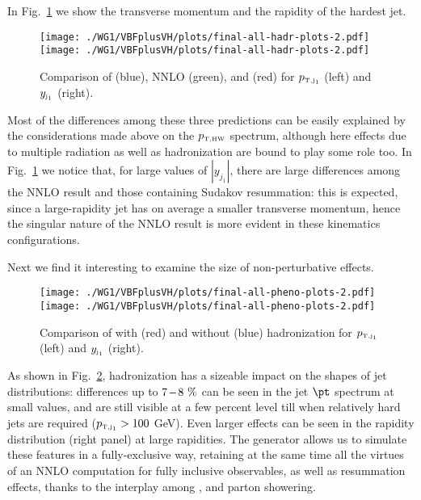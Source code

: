 In Fig.~\ref{fig:extra_ptj1_yj1} we show the transverse momentum and the
rapidity of the hardest jet.
\begin{figure}
  \centering
  \texttt{[image: ./WG1/VBFplusVH/plots/final-all-hadr-plots-2.pdf]}
  \texttt{[image: ./WG1/VBFplusVH/plots/final-all-hadr-plots-2.pdf]}
  \caption{Comparison of \HWJMINLOPS{} (blue), NNLO (green), and \HWNNLOPS{} (red) for $p_{\scriptscriptstyle \mathrm{T,j_{1}}}$ (left) and $y_{\scriptscriptstyle \mathrm{j_{1}}}$ (right).}
  \label{fig:extra_ptj1_yj1}
\end{figure}
Most of the differences among these three predictions can be easily
explained by the considerations made above on the $p_{\scriptscriptstyle \mathrm{T,HW}}$ spectrum,
although here effects due to multiple radiation as well as
hadronization are bound to play some role too.  In
Fig.~\ref{fig:extra_ptj1_yj1} we notice that, for large values of
$|y_{j_1}|$, there are large differences among the NNLO result and
those containing Sudakov resummation: this is expected, since a
large-rapidity jet has on average a smaller transverse momentum, hence
the singular nature of the NNLO result is more evident in these
kinematics configurations.

    
Next we find it interesting to examine the size of
non-perturbative effects.
\begin{figure}
  \centering
  \texttt{[image: ./WG1/VBFplusVH/plots/final-all-pheno-plots-2.pdf]}
  \texttt{[image: ./WG1/VBFplusVH/plots/final-all-pheno-plots-2.pdf]}
  \caption{Comparison of \HWNNLOPSshort{} with (red) and without (blue) hadronization for $p_{\scriptscriptstyle \mathrm{T,j_{1}}}$ (left) and $y_{\scriptscriptstyle \mathrm{j_{1}}}$ (right).}
  \label{fig:extra_nohad_ptj1_yj1}
\end{figure}
As shown in Fig.~\ref{fig:extra_nohad_ptj1_yj1}, hadronization has a
sizeable impact on the shapes of jet distributions: differences up to
$7\hspace{-0.05cm}-\hspace{-0.05cm}8~\%$ can be seen in the jet $\pt$
spectrum at small values, and are still visible at a few percent
level till when relatively hard jets are required ($p_{\scriptscriptstyle \mathrm{T,j_{1}}} > 100$
GeV). Even larger effects can be seen in the rapidity distribution (right panel) at large rapidities. The \HVNNLOPS{} generator allows us to simulate these features in a
fully-exclusive way, retaining at the same time all the virtues of an
NNLO computation for fully inclusive observables, as well as
resummation effects, thanks to the interplay among \POWHEG{}, \MINLO{}
and parton showering.

